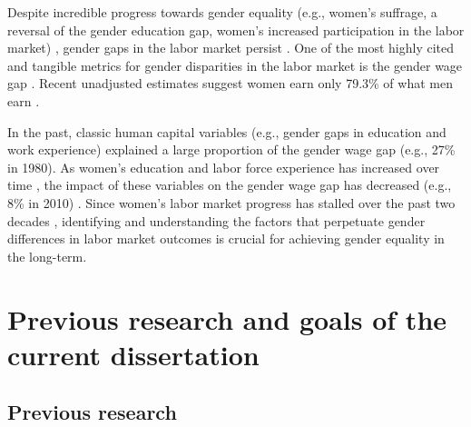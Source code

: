 \documentclass[a4paper,nobind]{templates/ociamthesis}
\begin{document}
Despite incredible progress towards gender equality (e.g., women's suffrage, a reversal of the gender education gap, women's increased participation in the labor market) \autocite{Goldin2014,Goldin2006a,Goldin2006,Blau2010,Blau2013,Blau2014,Bianchi2012,Sayer2005}, gender gaps in the labor market persist \autocite{Blau2017,Goldin2014,Hegewisch2014,Bertrand2001,Blau2014,Levanon2016,Blau2006b,Blau2006a}. One of the most highly cited and tangible metrics for gender disparities in the labor market is the gender wage gap \autocite{Blau2000,Blau2017,Nyhus2012,McGee2015,Goldin2014,Hegewisch2014,Bertrand2001,Blau2006b}. Recent unadjusted estimates suggest women earn only 79.3\% of what men earn \autocite{Blau2017}.

In the past, classic human capital variables (e.g., gender gaps in education and work experience) explained a large proportion of the gender wage gap (e.g., 27\% in 1980). As women's education and labor force experience has increased over time \autocite{Goldin2006a}, the impact of these variables on the gender wage gap has decreased (e.g., 8\% in 2010) \autocite{Blau2017}. Since women's labor market progress has stalled over the past two decades \autocite{Blau2006b,Goldin2014}, identifying and understanding the factors that perpetuate gender differences in labor market outcomes is crucial for achieving gender equality in the long-term.

\hypertarget{previous-research-and-goals-of-the-current-dissertation}{%
\section{Previous research and goals of the current dissertation}\label{previous-research-and-goals-of-the-current-dissertation}}

\hypertarget{previous-research}{%
\subsection{Previous research}\label{previous-research}}
\end{document}
